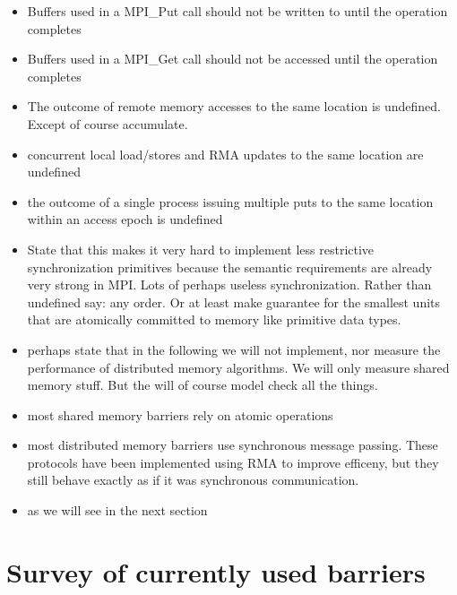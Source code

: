 \documentclass[a4paper, 10pt]{article}
\begin{document}
\begin{itemize}
\begin{itemize}
				\begin{itemize}
					\item Buffers used in a MPI\_Put call should not be written to until the operation completes
					\item Buffers used in a MPI\_Get call should not be accessed until the operation completes
					\item The outcome of remote memory accesses to the same location is undefined. Except of course accumulate.
					\item concurrent local load/stores and RMA updates to the same location are undefined
					\item the outcome of a single process issuing multiple puts to the same location within an access epoch is undefined
					\item State that this makes it very hard to implement less restrictive synchronization primitives because the semantic requirements are already very strong in MPI. Lots of perhaps useless synchronization. Rather than undefined say: any order. Or at least make guarantee for the smallest units that are atomically committed to memory like primitive data types.
					\item perhaps state that in the following we will not implement, nor measure the performance of distributed memory algorithms. We will only measure shared memory stuff. But the will of course model check all the things.
				\end{itemize}
		\end{itemize}
\end{itemize}

\begin{itemize}
	\item most shared memory barriers rely on atomic operations
	\item most distributed memory barriers use synchronous message passing. These protocols have been implemented using RMA to improve efficeny, but they still behave exactly as if it was synchronous communication.
	\item as we will see in the next section
\end{itemize}

\section{Survey of currently used barriers}

\end{document}
